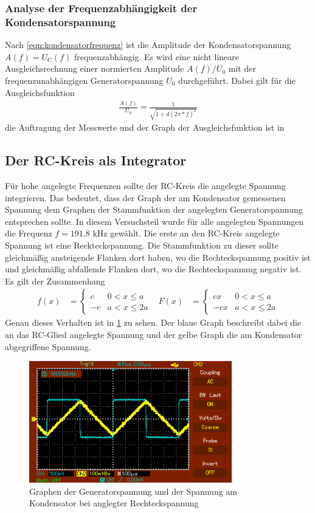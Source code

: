 \subsubsection{Analyse der Frequenzabhängigkeit der Kondensatorspannung}

Nach \eqref{eqn:kondensatorfrequenz} ist die Amplitude der Kondensatorspannung
$A(f) = U_\text{C}(f)$ frequenzabhängig. Es wird eine nicht lineare Ausgleichsrechnung
einer normierten Amplitude $A(f)/U_0$ mit der frequenzunabhängigen Generatorspannung $U_0$
durchgeführt. Dabei gilt für die Ausgleichsfunktion
\begin{align}
  \frac{A(f)}{U_0} = \frac{1}{\sqrt{1+d(2\pi*f)^2}}
\end{align}
 die Auftragung der Messwerte und der Graph der Ausgleichsfunktion ist in


\subsection{Der RC-Kreis als Integrator}

Für hohe angelegte Frequenzen sollte der RC-Kreis die angelegte Spannung integrieren.
Das bedeutet, dass der Graph der am Kondensator gemessenen Spannung dem Graphen der
Stammfunktion der angelegten Generatorspannung entsprechen sollte. In diesem Versuchsteil
wurde für alle angelegten Spannungen die Frequenz $f=191.8$ kHz gewählt.
Die erste an den RC-Kreis angelegte Spannung ist eine Reckteckspannung. Die Stammfunktion
zu dieser sollte gleichmäßig ansteigende Flanken dort haben, wo die Rechteckspannung
positiv ist und gleichmäßig abfallende Flanken dort, wo die Rechteckspannung
negativ ist. Es gilt der Zusammenhang
\begin{align}
  f(x)&=
  \begin{cases}
    c & 0<x\leq a\\
    -c & a<x\leq 2a
  \end{cases}
  & F(x)&=
  \begin{cases}
    c x & 0<x\leq a\\
    -c x & a<x\leq 2a
  \end{cases}
\end{align}
Genau dieses Verhalten ist in \ref{fig:rechteck} zu sehen. Der blaue Graph beschreibt
dabei die an das RC-Glied angelegte Spannung und der gelbe Graph die am Kondensator
abgegriffene Spannung.
\begin{figure}
  \centering
  \includegraphics[width=250pt]{data/integration_rechteck.PNG}
  \caption{Graphen der Generatorspannung und der Spannung am Kondensator bei anglegter
  Rechteckspannung}
  \label{fig:rechteck}
\end{figure}


